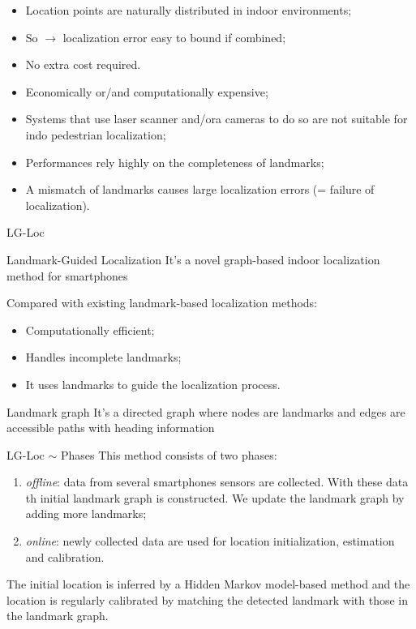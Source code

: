 \begin{frame}
    \pause 
    \begin{itemize}[<+->]
        \item Location points are naturally distributed in indoor environments;
        \item So $\rightarrow$ localization error easy to bound if combined;
        \item No extra cost required.
    \end{itemize}
    \pause
    \begin{itemize}[<+->]
        \item Economically or/and computationally expensive;
        \item Systems that use laser scanner and/ora cameras to do so are not suitable for indo pedestrian localization;
        \item Performances rely highly on the completeness of landmarks;
        \item A mismatch of landmarks causes large localization errors (= failure of localization). 
    \end{itemize}
\end{frame}

\begin{frame}{LG-Loc}
    \begin{block}{Landmark-Guided Localization}
        It's a novel graph-based indoor localization method for smartphones
    \end{block}
    \pause
    Compared with existing landmark-based localization methods:
    \begin{itemize}[<+->]
        \item Computationally efficient;
        \item Handles incomplete landmarks;
        \item It uses landmarks to guide the localization process.
    \end{itemize}
    \pause
    \begin{block}{Landmark graph}
        It's a directed graph where nodes are landmarks and edges are accessible paths with heading information
    \end{block}
\end{frame}

\begin{frame}{LG-Loc $\sim$ Phases}
    This method consists of two phases:
    \pause
    \begin{enumerate}[<+->]
        \item \textit{offline}: data from several smartphones sensors are collected. With these data th initial landmark graph is constructed. We update the landmark graph by adding more landmarks;
        \item \textit{online}: newly collected data are used for location initialization, estimation and calibration.
    \end{enumerate} 
    \pause
    The initial location is inferred by a Hidden Markov model-based method and the location is regularly calibrated by matching the detected landmark with those in the landmark graph. 
\end{frame}

